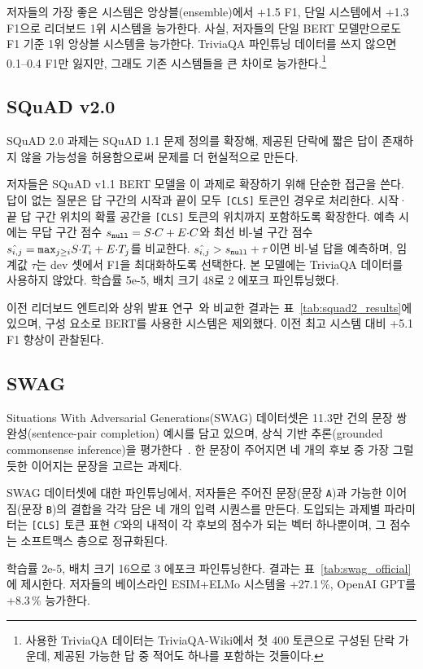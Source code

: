저자들의 가장 좋은 시스템은 앙상블(ensemble)에서 +1.5 F1, 단일 시스템에서 +1.3 F1으로 리더보드 1위 시스템을 능가한다. 사실, 저자들의 단일 BERT 모델만으로도 F1 기준 1위 앙상블 시스템을 능가한다. TriviaQA 파인튜닝 데이터를 쓰지 않으면 0.1--0.4 F1만 잃지만, 그래도 기존 시스템들을 큰 차이로 능가한다.\footnote{사용한 TriviaQA 데이터는 TriviaQA-Wiki에서 첫 400 토큰으로 구성된 단락 가운데, 제공된 가능한 답 중 적어도 하나를 포함하는 것들이다.}

\subsection{SQuAD v2.0}

SQuAD 2.0 과제는 SQuAD 1.1 문제 정의를 확장해, 제공된 단락에 짧은 답이 존재하지 않을 가능성을 허용함으로써 문제를 더 현실적으로 만든다.

저자들은 SQuAD v1.1 BERT 모델을 이 과제로 확장하기 위해 단순한 접근을 쓴다. 답이 없는 질문은 답 구간의 시작과 끝이 모두 {\tt [CLS]} 토큰인 경우로 처리한다. 시작·끝 답 구간 위치의 확률 공간을 {\tt [CLS]} 토큰의 위치까지 포함하도록 확장한다. 예측 시에는 무답 구간 점수 $s_{\tt null} = S{\cdot}C + E{\cdot}C$와 최선 비-널 구간 점수 $\hat{s_{i,j}} =  {\tt max}_{j \geq i} S{\cdot}T_i + E{\cdot}T_j$를 비교한다. $\hat{s_{i,j}} > s_{\tt null} + \tau$이면 비-널 답을 예측하며, 임계값 $\tau$는 dev 셋에서 F1을 최대화하도록 선택한다. 본 모델에는 TriviaQA 데이터를 사용하지 않았다. 학습률 5e-5, 배치 크기 48로 2 에포크 파인튜닝했다.

이전 리더보드 엔트리와 상위 발표 연구~\cite{unet,slqa}와 비교한 결과는 표~\ref{tab:squad2_results}에 있으며, 구성 요소로 BERT를 사용한 시스템은 제외했다. 이전 최고 시스템 대비 +5.1 F1 향상이 관찰된다.


\subsection{SWAG}
\label{sec:swag}
Situations With Adversarial Generations(SWAG) 데이터셋은 11.3만 건의 문장 쌍 완성(sentence-pair completion) 예시를 담고 있으며, 상식 기반 추론(grounded commonsense inference)을 평가한다~\cite{zellers2018swag}. 한 문장이 주어지면 네 개의 후보 중 가장 그럴듯한 이어지는 문장을 고르는 과제다.


SWAG 데이터셋에 대한 파인튜닝에서, 저자들은 주어진 문장(문장 {\tt A})과 가능한 이어짐(문장 {\tt B})의 결합을 각각 담은 네 개의 입력 시퀀스를 만든다. 도입되는 과제별 파라미터는 {\tt [CLS]} 토큰 표현 $C$와의 내적이 각 후보의 점수가 되는 벡터 하나뿐이며, 그 점수는 소프트맥스 층으로 정규화된다.

학습률 2e-5, 배치 크기 16으로 3 에포크 파인튜닝한다. 결과는 표~\ref{tab:swag_official}에 제시한다.  저자들의 베이스라인 ESIM+ELMo 시스템을 +27.1\,\%, OpenAI GPT를 +8.3\,\% 능가한다.


